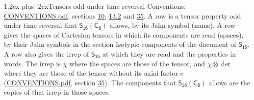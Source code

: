 \documentclass[10pt,a4paper]{article}
\makeatletter
\renewcommand\section{\@startsection{section}{1}{\z@}{-3ex plus -1ex minus -.2ex}%
  {1.2ex plus .2ex}{\normalfont\large\sffamily\bfseries\color{parttitle}}}
\numberwithin{equation}{section}
\newcommand{\grp}[1]{\mathsf{#1}}
\newcommand{\irrprod}{\otimes}
\makeatother
\begin{document}
\section{Tensors odd under time reversal}\label{s:time_odd}
Conventions: \href{../../CONVENTIONS.pdf}{CONVENTIONS.pdf}, sections \href{../../../rotation/CONVENTIONS.pdf\#conv.10}{10}, \href{../../../rotation/CONVENTIONS.pdf\#conv.13.2}{13.2} and \href{../../CONVENTIONS.pdf\#conv.35}{35}.
\leavevmode\label{n:head.name.property}A row is a tensor property odd under time reversal that $\grp{S_{16}}(\grp{C_{8}})$ allows, by its Jahn symbol (name). \label{n:head.spaces}A row gives the spaces of Cartesian tensors in which its components are read (spaces), by their Jahn symbols in the section Isotypic components of the document of \href{../../../rotation/data/pdf/S16.pdf}{$\grp{S_{16}}$}. \label{n:head.properties}A row also gives the irrep of $\grp{S_{16}}$ at which they are read and the properties in words. The irrep is $\chi$ where the spaces are those of the tensor, and $\chi \irrprod \det$ where they are those of the tensor without its axial factor e (\href{../../CONVENTIONS.pdf}{CONVENTIONS.pdf}, section \href{../../CONVENTIONS.pdf\#conv.35}{35}). The components that $\grp{S_{16}}(\grp{C_{8}})$ allows are the copies of that irrep in those spaces.
\end{document}

